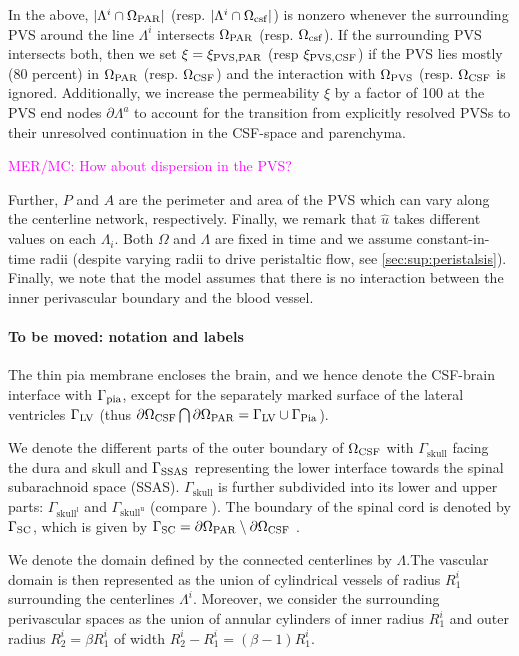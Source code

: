 \documentclass[fleqn,10pt]{wlscirep}
\newcommand{\mer}[1]{\textcolor{magenta}{#1}}
\begin{document}
In the above,  $|\Lambda^i \cap \Omega_{\rm{PAR}}|$ (resp.  $|\Lambda^i \cap \Omega_{\rm{csf}}|$) is nonzero whenever the surrounding PVS around the line $\Lambda^i$ intersects $\Omega_{\rm{PAR}}$ (resp. $\Omega_{\rm{csf}}$). If the surrounding PVS intersects both, then we set $\xi = \xi_{\mathrm{PVS}, \rm{PAR}}$ (resp $\xi_{\mathrm{PVS}, \rm{CSF}}$) if the PVS lies mostly ($80$ percent) in $\Omega_{\rm{PAR}}$ (resp. $\Omega_{\rm{CSF}}$) and the interaction with $\Omega_{\rm{PVS}}$ (resp. $\Omega_{\rm{CSF}}$ is ignored. Additionally, we increase the permeability $\xi$ by a factor of 100 at the PVS end nodes $\partial \Lambda^a$ to account for the transition from explicitly resolved PVSs to their unresolved continuation in the CSF-space and parenchyma.

\mer{MER/MC: How about dispersion in the PVS?}


Further, $P$ and $A$ are the perimeter and area of the PVS which can vary along the centerline network, respectively.  Finally, we remark that $\hat u$ takes different values on each $\Lambda_i$.  Both $\Omega$ and $\Lambda$ are fixed in time and we assume constant-in- time radii (despite varying radii to drive peristaltic flow, see \cref{sec:sup:peristalsis}). Finally, we note that the model assumes that there is no interaction between the inner perivascular boundary and the blood vessel. 

\paragraph*{To be moved: notation and labels}
The thin pia membrane encloses the brain, and we hence denote the CSF-brain interface with $\Gamma_{\rm pia}$, except for the separately marked surface of the lateral ventricles $\Gamma_{\rm LV}$ (thus $\partial \Omega_{\rm CSF} \bigcap \partial \Omega_{\rm PAR} = \Gamma_{\rm LV} \cup \Gamma_{\rm Pia}$).

We denote the different parts of the outer boundary of $\Omega_{\rm CSF}$ with
$\Gamma_{\mathrm{skull}}$ facing the dura and skull and $\Gamma_{\rm SSAS}$ representing the lower interface towards the spinal subarachnoid space (SSAS). $\Gamma_{\mathrm{skull}}$ is further subdivided into its lower and upper parts: $\Gamma_{\mathrm{skull^l}}$ and $\Gamma_{\mathrm{skull^u}}$ (compare ). The boundary of the spinal cord is denoted by $\Gamma_{\rm{SC}}$, which is given by $\Gamma_{\rm{SC}} = \partial \Omega_{\rm PAR} \setminus \partial \Omega_{\rm CSF}$ .

We denote the domain defined by the connected centerlines by
$\Lambda$.The vascular domain is then represented as the union of
cylindrical vessels of radius $R_1^i$ surrounding the centerlines
$\Lambda^i$. Moreover, we consider the surrounding perivascular spaces
as the union of annular cylinders of inner radius $R_1^i$ and outer
radius $R_2^i = \beta R_1^i$ of width $R_2^i - R_1^i = (\beta - 1)
R_1^i$. 
\end{document}
